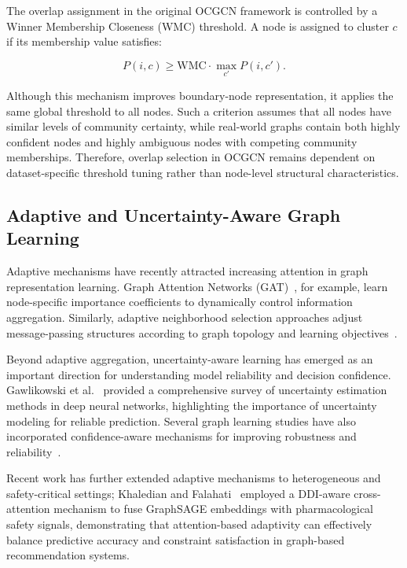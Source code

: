 \documentclass[pdflatex,sn-mathphys-num]{sn-jnl}%
\theoremstyle{thmstyleone}%
\theoremstyle{thmstyletwo}%
\theoremstyle{thmstylethree}%
\begin{document}
The overlap assignment in the original OCGCN framework is controlled by a Winner Membership Closeness (WMC) threshold.
A node is assigned to cluster $c$ if its membership value satisfies:

\[
P(i,c) \geq \mathrm{WMC}\cdot \max_{c'}P(i,c').
\]

Although this mechanism improves boundary-node representation, it applies the same global threshold to all nodes.
Such a criterion assumes that all nodes have similar levels of community certainty, while real-world graphs contain both highly confident nodes and highly ambiguous nodes with competing community memberships.
Therefore, overlap selection in OCGCN remains dependent on dataset-specific threshold tuning rather than node-level structural characteristics.

\subsection{Adaptive and Uncertainty-Aware Graph Learning}
\label{subsec:adaptive-uncertainty}

Adaptive mechanisms have recently attracted increasing attention in graph representation learning.
Graph Attention Networks (GAT)~\citep{vel2018graph}, for example, learn node-specific importance coefficients to dynamically control information aggregation.
Similarly, adaptive neighborhood selection approaches adjust message-passing structures according to graph topology and learning objectives~\citep{Peng2021, Guang2024}.

Beyond adaptive aggregation, uncertainty-aware learning has emerged as an important direction for understanding model reliability and decision confidence.
Gawlikowski et al.~\citep{Gawlikowski2023} provided a comprehensive survey of uncertainty estimation methods in deep neural networks, highlighting the importance of uncertainty modeling for reliable prediction.
Several graph learning studies have also incorporated confidence-aware mechanisms for improving robustness and reliability~\citep{Kwon2022, Park2023}.

Recent work has further extended adaptive mechanisms to heterogeneous and safety-critical settings; Khaledian and Falahati~\citep{Khaledian2026} employed a DDI-aware cross-attention mechanism to fuse GraphSAGE embeddings with pharmacological safety signals, demonstrating that attention-based adaptivity can effectively balance predictive accuracy and constraint satisfaction in graph-based recommendation systems.
\end{document}
